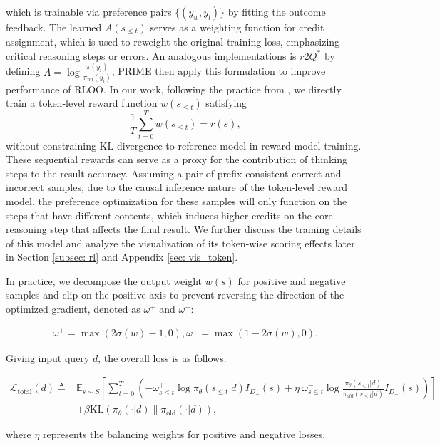 which is trainable via preference pairs $\{(y_w, y_l)\}$ by fitting the outcome feedback. The learned $A(s_{\leq t})$ serves as a weighting function for credit assignment, which is used to reweight the original training loss, emphasizing critical reasoning steps or errors. An analogous implementations is $ r 2 Q^* $ \cite{rafailov2024r, xia2024inverse} by defining $A = \log \frac{\pi(y_i)}{\pi_{\text{ref}}(y_i)}$, PRIME \cite{cui2025process} then apply this formulation to improve performance of RLOO. In our work, following the practice from \cite{cobbe2021training}, we directly train a token-level reward function $w(s_{\leq t})$ satisfying
\[
\frac{1}{T}\sum_{t=0}^{T} w(s_{\leq t}) = r(s),
\]
without constraining KL-divergence to reference model in reward model training. These sequential rewards can serve as a proxy for the contribution of thinking steps to the result accuracy. Assuming a pair of prefix-consistent correct and incorrect samples, due to the causal inference nature of the token-level reward model, the preference optimization for these samples will only function on the steps that have different contents, which induces higher credits on the core reasoning step that affects the final result. We further discuss the training details of this model and analyze the visualization of its token-wise scoring effects later in Section \ref{subsec: rl} and Appendix \ref{sec: vis_token}.

In practice, we decompose the output weight $w(s)$ for positive and negative samples and clip on the positive axis to prevent reversing the direction of the optimized gradient, denoted as $\omega^+$ and $\omega^-$:

\begin{align}
\omega^+ = \max(2 \sigma(w) - 1, 0), \omega^- = \max(1 - 2\sigma(w), 0).
\end{align}

Giving input query $d$, the overall loss is as follows:


\begin{equation}
\begin{aligned}\label{eq: overall loss}
\mathcal{L}_{\text{total}}(d) \triangleq &\mathbb{E}_{s \sim S} \left[ \sum_{t=0}^T \left( -\omega_{s\leq t}^+\log \pi_{\theta}(s_{\leq t}|d)I_{D_+}(s) +  \eta 
 \ \omega_{s\leq t}^-\log \frac{\pi_\theta(s_{\leq t}|d)}{\pi_{old}(s_{\leq t}|d)}I_{D_-}(s) \right) \right] \\ &+ \beta \text{KL}(\pi_\theta(\cdot|d) \parallel \pi_{\text{old}}(\cdot|d)),
\end{aligned}
\end{equation}

where $\eta$ represents the balancing weights for positive and negative losses.